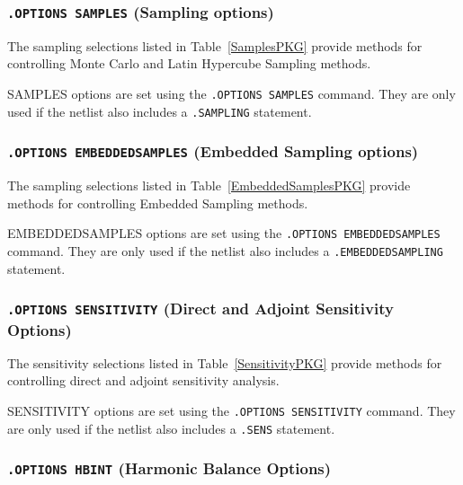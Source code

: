 \subsubsection{\texttt{.OPTIONS SAMPLES} (Sampling options)}

The sampling selections listed in Table~\ref{SamplesPKG}
provide methods for controlling Monte Carlo and Latin Hypercube Sampling methods.

SAMPLES options are set using the \texttt{.OPTIONS SAMPLES} command. 
They are only used if the netlist also includes a \texttt{.SAMPLING} statement. 



\subsubsection{\texttt{.OPTIONS EMBEDDEDSAMPLES} (Embedded Sampling options)}

The sampling selections listed in Table~\ref{EmbeddedSamplesPKG}
provide methods for controlling Embedded Sampling methods.

EMBEDDEDSAMPLES options are set using the \texttt{.OPTIONS EMBEDDEDSAMPLES}
command.  They are only used if the
netlist also includes a \texttt{.EMBEDDEDSAMPLING} statement.



\subsubsection{\texttt{.OPTIONS SENSITIVITY} (Direct and Adjoint Sensitivity Options)}

The sensitivity selections listed in Table~\ref{SensitivityPKG}
provide methods for controlling direct and adjoint sensitivity analysis.

SENSITIVITY options are set using the \texttt{.OPTIONS SENSITIVITY} command. 
They are only used if the netlist also includes a \texttt{.SENS} statement. 




\subsubsection{\texttt{.OPTIONS HBINT} (Harmonic Balance Options)}

